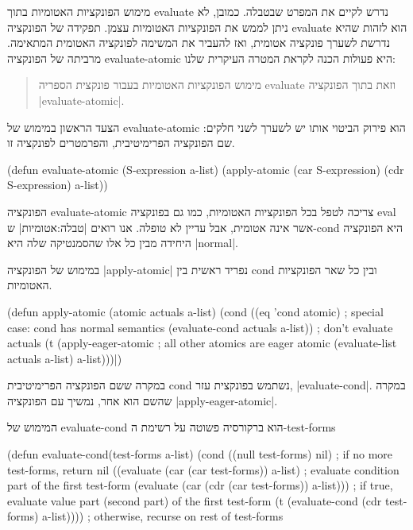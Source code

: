 מימוש הפונקציות האטומיות בתוך evaluate נדרש לקיים את המפרט שבטבלה. כמובן, לא
ניתן לממש את הפונקציות האטומיות עצמן. תפקידה של הפונקציה evaluate הוא לזהות
שהיא נדרשת לשערך פונקציה אטומית, ואז להעביר את המשימה לפונקציה האטומית המתאימה.
מרביתה של הפונקציה evaluate-atomic היא פעולות הכנה לקראת המטרה העיקרית שלנו:
\begin{quote}
  מימוש הפונקציות האטומיות בעבור פונקצית הספריה evaluate וזאת בתוך הפונקציה
  \E|evaluate-atomic|.
\end{quote}

הצעד הראשון במימוש של evaluate-atomic הוא פירוק הביטוי אותו יש לשערך לשני
חלקים: שם הפונקציה הפרימיטיבית, והפרמטרים לפונקציה זו.
\begin{KERNEL}
(defun evaluate-atomic (S-expression a-list)
  (apply-atomic (car S-expression) (cdr S-expression) a-list))
\end{KERNEL}

הפונקציה evaluate-atomic צריכה לטפל בכל הפונקציות האטומיות, כמו גם בפונקציה
eval אשר אינה אטומית, אבל עדיין לא טופלה. אנו רואים |טבלה:אטומיות| ש-cond
היא הפונקציה היחידה מבין כל אלו שהסמנטיקה שלה היא \E|normal|.

\minipage\textwidth
במימוש של הפונקציה \E|apply-atomic| נפריד ראשית בין cond ובין כל שאר הפונקציות
האטומיות.
\begin{KERNEL}
(defun apply-atomic (atomic actuals a-list)
  (cond ((eq 'cond atomic) ; special case: cond has normal semantics
            (evaluate-cond actuals a-list)) ; don't evaluate actuals
        (t (apply-eager-atomic ; all other atomics are eager
              atomic
              (evaluate-list actuals a-list)
              a-list)))|)
\end{KERNEL}
\endminipage

במקרה ששם הפונקציה הפרימיטיבית cond נשתמש בפונקצית עזר, \E|evaluate-cond|. במקרה
שהשם הוא אחר, נמשיך עם הפונקציה \E|apply-eager-atomic|.

המימוש של evaluate-cond הוא ברקורסיה פשוטה על רשימת ה-test-forms
\begin{KERNEL}
(defun evaluate-cond(test-forms a-list)
  (cond ((null test-forms) nil) ; if no more test-forms, return nil
        ((evaluate (car (car test-forms)) a-list) ; evaluate condition part of the first test-form
        (evaluate (car (cdr (car test-forms)) a-list))) ; if true, evaluate value part (second part) of the first test-form
        (t (evaluate-cond (cdr test-forms) a-list)))) ; otherwise, recurse on rest of test-forms
\end{KERNEL}


